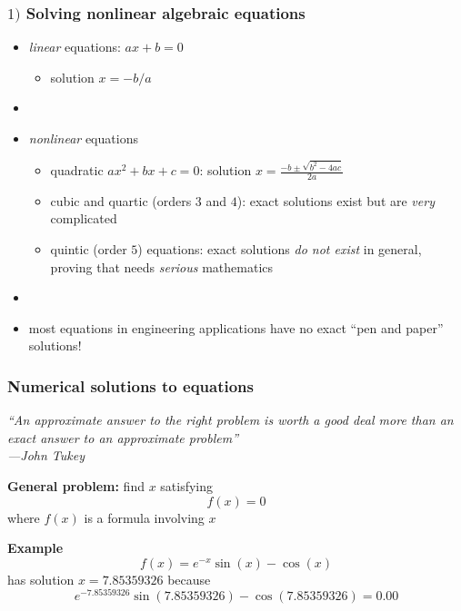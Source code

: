 \documentclass[english,14pt]{beamer}
\newcommand\red[1]{{\color{red} #1}}
\begin{document}
\begin{frame}[fragile]

\frametitle{$1)$ Solving nonlinear algebraic equations}

\begin{itemize}
	\item \red{\emph{linear}} equations: $ax + b = 0$
	\begin{itemize}
		\item solution $x = -b/a$
	\end{itemize}
	\item[]
	\item \red{\emph{nonlinear}} equations
	\begin{itemize}
		\item quadratic $ax^2 + bx+c = 0$: solution $x = \frac{-b \pm\sqrt{b^2-4ac}}{2a}$
		\item cubic and quartic (orders $3$ and $4$): exact solutions exist but are \emph{very} complicated
		\item quintic (order $5$) equations: exact solutions \emph{do not exist} in general, proving that needs \emph{serious} mathematics
	\end{itemize}
	\item[]
	\item most equations in engineering applications have no exact ``pen and paper'' solutions!
	
	
\end{itemize}

\end{frame}


\begin{frame}[fragile]

\frametitle{Numerical solutions to equations}

\begin{flushright}
\small \emph{``An approximate answer to the right problem is worth a good deal more than an exact answer to an approximate problem''\\ ---John Tukey}
\end{flushright}
\vspace*{-3mm}
\textbf{General problem:} find $x$ satisfying
	\[
		f(x) = 0
	\]
	where $f(x)$ is a formula involving $x$
	
	\textbf{Example}
	\[
		f(x) = e^{-x}\sin(x) - \cos(x)
	\]
	has solution $x = 7.85359326$ because
	\[
	e^{-7.85359326}\sin(7.85359326) - \cos(7.85359326) = 0.00
	\]

\end{frame}
\end{document}
